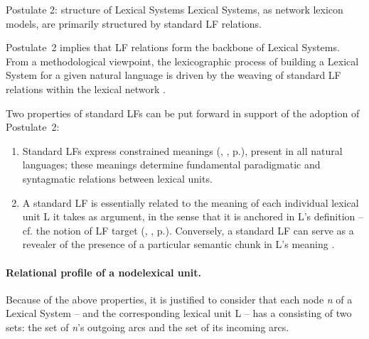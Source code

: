 \label{txt:postulateStrucLS}\begin{soundbox}{Postulate 2: structure of Lexical Systems}
Lexical Systems, as network lexicon models, are primarily structured by standard LF relations.
\end{soundbox}

Postulate~2 implies that LF relations form the backbone of Lexical Systems. From a methodological viewpoint, the lexicographic process of building a Lexical System for a given natural language is driven by the weaving of standard LF relations within the lexical network \parencite{LuxPogodallaPolguere2011,Polguere2012e-e}.

Two properties of standard LFs can be put forward in support of the adoption of Postulate~2:

\begin{enumerate}

\item Standard LFs express constrained meanings (, \pageref{sec:LFDefinitionNotion}, p.\thinspace\pageref{txt:constrainedMeaning}), present in all natural languages; these meanings determine fundamental paradigmatic and syntagmatic relations between lexical units.

\item A standard LF is essentially related to the meaning of each individual lexical unit L it takes as argument, in the sense that it is anchored in L's definition -- cf. the notion of LF target (, , p.\thinspace\pageref{txt:targetOfSyntLF}). Conversely, a standard LF can serve as a revealer of the presence of a particular semantic chunk in L's meaning \parencite{IordanskajaPolguere2005}.

\end{enumerate}

\paragraph*{Relational profile of a node\slashs{}lexical unit.}\label{par:relationalProfile}

Because of the above properties, it is justified to consider that each node \textit{n} of a Lexical System -- and the corresponding lexical unit L -- has a  consisting of two sets: the set of \textit{n}'s outgoing arcs and the set of its incoming arcs.

